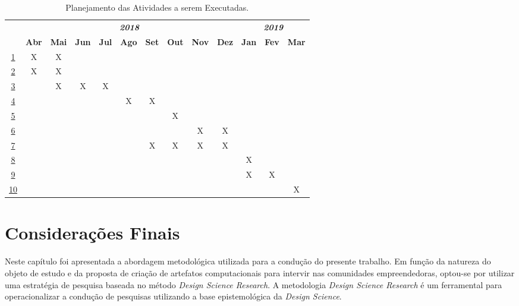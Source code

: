 \begin{table}[htbp]
	\caption{Planejamento das Atividades a serem Executadas.}
	\begin{tabular}{|c|c|c|c|c|c|c|c|c|c|c|c|c|}
		\hline
		~ & \multicolumn{9}{c|}{\textbf{\textit{2018}}} & \multicolumn{3}{c|}{\textbf{\textit{2019}}}    \\ \cline{2-13}
		~  & \textbf{Abr} & \textbf{Mai} & \textbf{Jun} & \textbf{Jul} & \textbf{Ago}  & \textbf{Set} & \textbf{Out} & \textbf{Nov} & \textbf{Dez} & \textbf{Jan} & \textbf{Fev}  & \textbf{Mar} \hypertarget{task1}{} \\ \hline
		\hyperlink{txtask1}{1}  & X & X & ~   & ~   & ~    & ~   & ~   & ~   & ~   & ~   & ~    & ~   \hypertarget{task2}{}\\ \hline
		\hyperlink{txtask2}{2}  & X  & X & ~ & ~ & ~    & ~   & ~   & ~   & ~   & ~   & ~    & ~   \hypertarget{task3}{}\\ \hline
		\hyperlink{txtask3}{3}  & ~   & X  & X & X  & ~    & ~   & ~   & ~   & ~   & ~   & ~    & ~   \hypertarget{task4}{}\\ \hline
		\hyperlink{txtask4}{4}  & ~   & ~   & ~ & ~ & X  & X & ~   & ~   & ~   & ~   & ~    & ~   \hypertarget{task5}{}\\ \hline
		\hyperlink{txtask5}{5}  & ~   & ~   & ~   & ~   & ~    & ~  & X & ~   & ~   & ~   & ~    & ~   \hypertarget{task6}{}\\ \hline
		\hyperlink{txtask6}{6}  & ~   & ~   & ~   & ~   & ~    & ~   & ~ & X & X & ~   & ~    & ~   \hypertarget{task7}{}\\ \hline
		\hyperlink{txtask7}{7}  & ~   & ~   & ~   & ~   & ~    & X & X & X & X  & ~   & ~    & ~   \hypertarget{task8}{}\\ \hline
		\hyperlink{txtask8}{8}  & ~   & ~   & ~   & ~   & ~    & ~   & ~   & ~   & ~   & X  & ~  & ~   \hypertarget{task9}{}\\ \hline
		\hyperlink{txtask9}{9}  & ~   & ~   & ~   & ~   & ~    & ~   & ~   & ~   & ~   & X & X & ~ 
		\hypertarget{task10}{}\\ \hline
		\hyperlink{txtask10}{10}  & ~   & ~   & ~   & ~   & ~    & ~   & ~   & ~   & ~   & ~ & ~ & X \\
		\hline
	\end{tabular}
	
	\label{cronograma}
\end{table}

\section{Considerações Finais}
Neste capítulo foi apresentada a abordagem metodológica utilizada para a condução do presente trabalho. Em função da natureza do objeto de estudo e da proposta de criação de artefatos computacionais para intervir nas comunidades empreendedoras, optou-se por utilizar uma estratégia de pesquisa baseada no método \textit{Design Science Research}. A metodologia \textit{Design Science Research} é um ferramental para operacionalizar a condução de pesquisas utilizando a base epistemológica da \textit{Design Science}. 

